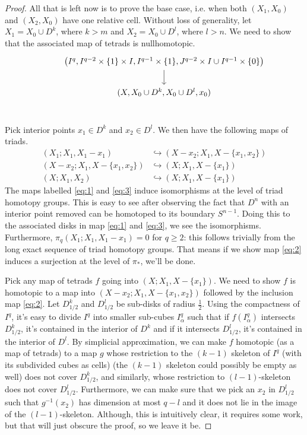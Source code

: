 \documentclass[12pt, notitlepage]{article}
\theoremstyle{definition}
\begin{document}
\begin{proof}
    All that is left now is to prove the base case, i.e. when both $(X_1, X_0)$ and $(X_2, X_0)$
    have one relative cell. Without loss of generality, let $X_1 = X_0 \cup D^k$, where $k > m$ and
    $X_2 = X_0 \cup D^l$, where $l > n$. We need to show that the associated map of tetrads is
    nullhomotopic.
    \[
      \begin{tikzcd}
        &\left( I^q, I^{q-2} \times \{1\} \times I, I^{q-1} \times \{1\}, J^{q-2} \times I \cup I^{q-1} \times \{0\} \right) \ar[d] \\
        &(X, X_0 \cup D^k, X_0 \cup D^l, x_0) \\
      \end{tikzcd}
    \]

    Pick interior points $x_1 \in D^k$ and $x_2 \in D^l$. We then have the following maps of triads.
    \begin{align}
      (X_1; X_1, X_1 - x_1) &\hookrightarrow (X - x_2; X_1, X - \{x_1, x_2\}) \label{eq:1} \\
      (X - x_2; X_1, X - \{x_1, x_2\}) &\hookrightarrow (X; X_1, X - \{x_1\}) \label{eq:2} \\
      (X; X_1, X_2) &\hookrightarrow (X; X_1, X - \{x_1\}) \label{eq:3}
    \end{align}
    The maps labelled \ref{eq:1} and \ref{eq:3} induce isomorphisms at the level of triad homotopy
    groups.  This is easy to see after observing the fact that $D^n$ with an interior point removed
    can be homotoped to its boundary $S^{n-1}$. Doing this to the associated disks in map \ref{eq:1}
    and \ref{eq:3}, we see the isomorphisms. Furthermore, $\pi_q(X_1; X_1, X_1 - x_1) = 0$ for
    $q \geq 2$: this follows trivially from the long exact sequence of triad homotopy groups. That
    means if we show map \ref{eq:2} induces a surjection at the level of $\pi_{\ast}$, we'll be
    done.

    Pick any map of tetrads $f$ going into $(X; X_1, X - \{x_1\})$. We need to show $f$ is homotopic
    to a map into $(X - x_2; X_1, X - \{x_1, x_2\})$ followed by the inclusion map \ref{eq:2}. Let
    $D^k_{1/2}$ and $D^l_{1/2}$ be sub-disks of radius $\frac{1}{2}$. Using the compactness of
    $I^q$, it's easy to divide $I^q$ into smaller sub-cubes $I^q_{\alpha}$ such that if
    $f(I^q_{\alpha})$ intersects $D^k_{1/2}$, it's contained in the interior of $D^k$ and if it
    intersects $D^l_{1/2}$, it's contained in the interior of $D^l$. By simplicial approximation, we
    can make $f$ homotopic (as a map of tetrads) to a map $g$ whose restriction to the $(k-1)$
    skeleton of $I^q$ (with its subdivided cubes as cells) (the $(k-1)$ skeleton could possibly be
    empty as well) does not cover $D^k_{1/2}$, and similarly, whose restriction to $(l-1)$-skeleton
    does not cover $D^l_{1/2}$. Furthermore, we can make sure that we pick an $x_2$ in $D^l_{1/2}$
    such that $g^{-1}(x_2)$ has dimension at most $q-l$ and it does not lie in the image of the
    $(l-1)$-skeleton. Although, this is intuitively clear, it requires some work, but that will just
    obscure the proof, so we leave it be.


\end{proof}
\end{document}
